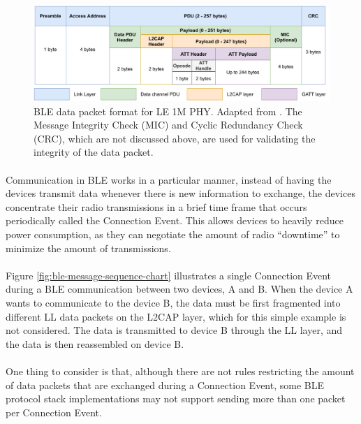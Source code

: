 \begin{figure}[H]
    \centering
    \includegraphics[width=\linewidth]{images/bluetooth data packet format.pdf}
    \caption[Diagram of the \acs{BLE} data packet format for LE 1M \acs{PHY}.]{\acs{BLE} data packet format for LE 1M \acs{PHY}. Adapted from \cite{Specification1999, Farej2020}. The Message Integrity Check (MIC) and Cyclic Redundancy Check (CRC), which are not discussed above, are used for validating the integrity of the data packet.}
    \label{fig:ble-ll-packet-format}
\end{figure}

\paragraph{} Communication in \acs{BLE} works in a particular manner, instead of having the devices transmit data whenever there is new information to exchange, the devices concentrate their radio transmissions in a brief time frame that occurs periodically called the Connection Event. This allows devices to heavily reduce power consumption, as they can negotiate the amount of radio ``downtime'' to minimize the amount of transmissions.

\paragraph{}  Figure \ref{fig:ble-message-sequence-chart} illustrates a single Connection Event during a \acs{BLE} communication between two devices, A and B. When the device A wants to communicate to the device B, the data must be first fragmented into different \acs{LL} data packets on the \acs{L2CAP} layer, which for this simple example is not considered. The data is transmitted to device B through the \acs{LL} layer, and the data is then reassembled on device B. 

\paragraph{} One thing to consider is that, although there are not rules restricting the amount of data packets that are exchanged during a Connection Event, some \acs{BLE} protocol stack implementations may not support sending more than one packet per Connection Event.


